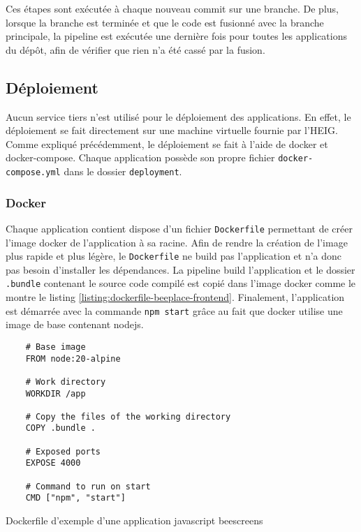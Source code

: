 Ces étapes sont exécutée à chaque nouveau commit sur une branche. De plus, lorsque la branche est terminée et que le code est fusionné avec la branche principale, la pipeline est exécutée une dernière fois pour toutes les applications du dépôt, afin de vérifier que rien n'a été cassé par la fusion.

\subsection{Déploiement}
\label{sec:deploiement}

Aucun service tiers n'est utilisé pour le déploiement des applications. En effet, le déploiement se fait directement sur une machine virtuelle fournie par l'HEIG. Comme expliqué précédemment, le déploiement se fait à l'aide de \gls{docker} et \gls{docker-compose}. Chaque application possède son propre fichier \texttt{docker-compose.yml} dans le dossier \texttt{deployment}.

\subsubsection{Docker}

Chaque application contient dispose d'un fichier \texttt{Dockerfile} permettant de créer l'image \gls{docker} de l'application à sa racine. Afin de rendre la création de l'image plus rapide et plus légère, le \texttt{Dockerfile} ne build pas l'application et n'a donc pas besoin d'installer les dépendances. La pipeline build l'application et le dossier \texttt{.bundle} contenant le source code compilé est copié dans l'image \gls{docker} comme le montre le listing \ref{listing:dockerfile-beeplace-frontend}. Finalement, l'application est démarrée avec la commande \texttt{npm start} grâce au fait que \gls{docker} utilise une image de base contenant \gls{nodejs}.

\begin{listing}[H]
  \begin{verbatim}
    # Base image
    FROM node:20-alpine

    # Work directory
    WORKDIR /app

    # Copy the files of the working directory
    COPY .bundle .

    # Exposed ports
    EXPOSE 4000

    # Command to run on start
    CMD ["npm", "start"]
\end{verbatim}
  \caption{Dockerfile d'exemple d'une application \gls{javascript} \gls{beescreens}}
  \label{listing:dockerfile-beeplace-frontend}
\end{listing}

